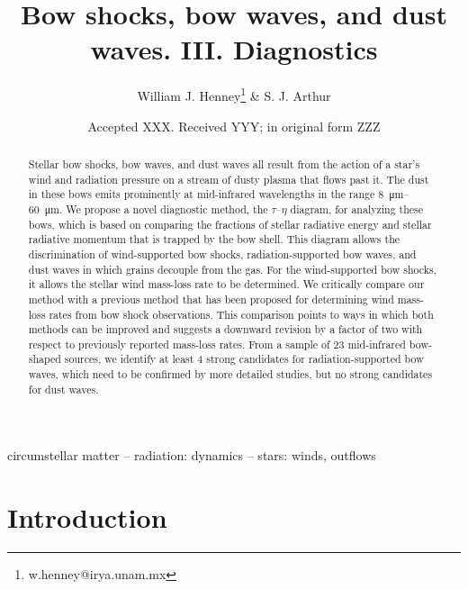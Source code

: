 \documentclass[useAMS, usenatbib, a4paper]{mnras}
\title{Bow shocks, bow waves, and dust waves. III. Diagnostics}
\author[Henney \& Arthur]{
  William J. Henney\thanks{w.henney@irya.unam.mx}
  \& S. J. Arthur\\
  \AddressCRyA
}
\date{Accepted XXX. Received YYY; in original form ZZZ}
\begin{document}
\label{firstpage}
\pagerange{\pageref{firstpage}--\pageref{lastpage}}
\maketitle
\begin{abstract}
  Stellar bow shocks, bow waves, and dust waves all result from the
  action of a star's wind and radiation pressure on a stream of dusty
  plasma that flows past it.  The dust in these bows emits prominently
  at mid-infrared wavelengths in the range \SIrange{8}{60}{\um}. We
  propose a novel diagnostic method, the \(\tau\)--\(\eta\) diagram,
  for analyzing these bows, which is based on comparing the fractions
  of stellar radiative energy and stellar radiative momentum that is
  trapped by the bow shell.  This diagram allows the discrimination of
  wind-supported bow shocks, radiation-supported bow waves, and dust
  waves in which grains decouple from the gas.  For the wind-supported
  bow shocks, it allows the stellar wind mass-loss rate to be
  determined.  We critically compare our method with a previous method
  that has been proposed for determining wind mass-loss rates from bow
  shock observations. This comparison points to ways in which both
  methods can be improved and suggests a downward revision by a factor
  of two with respect to previously reported mass-loss rates.  From a
  sample of 23 mid-infrared bow-shaped sources, we identify at least 4
  strong candidates for radiation-supported bow waves, which need to
  be confirmed by more detailed studies, but no strong candidates for
  dust waves.
\end{abstract}

\begin{keywords}
  circumstellar matter -- radiation: dynamics -- stars: winds, outflows
\end{keywords}

\section{Introduction}
\label{sec:introduction}
\end{document}
